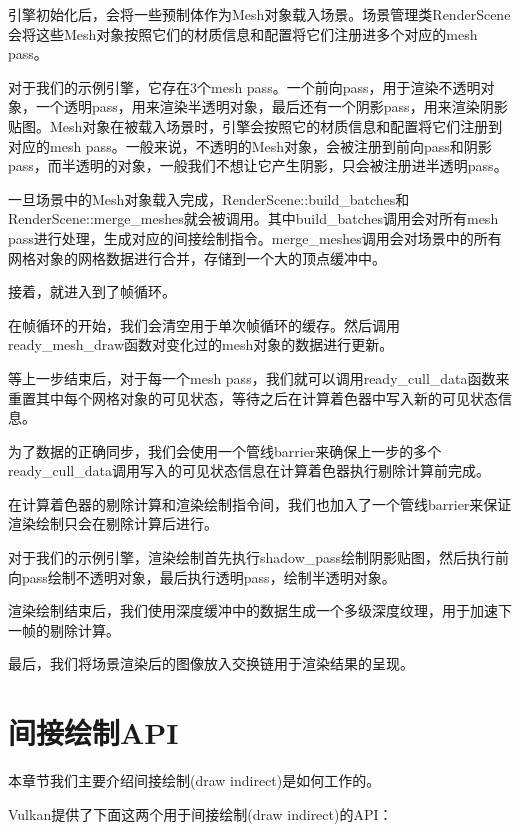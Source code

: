 \documentclass{ctexart}
\begin{document}
引擎初始化后，会将一些预制体作为Mesh对象载入场景。场景管理类RenderScene会将这些Mesh对象按照它们的材质信息和配置将它们注册进多个对应的mesh pass。

对于我们的示例引擎，它存在3个mesh pass。一个前向pass，用于渲染不透明对象，一个透明pass，用来渲染半透明对象，最后还有一个阴影pass，用来渲染阴影贴图。Mesh对象在被载入场景时，引擎会按照它的材质信息和配置将它们注册到对应的mesh pass。一般来说，不透明的Mesh对象，会被注册到前向pass和阴影pass，而半透明的对象，一般我们不想让它产生阴影，只会被注册进半透明pass。

一旦场景中的Mesh对象载入完成，RenderScene::build\_batches和RenderScene::merge\_meshes就会被调用。其中build\_batches调用会对所有mesh pass进行处理，生成对应的间接绘制指令。merge\_meshes调用会对场景中的所有网格对象的网格数据进行合并，存储到一个大的顶点缓冲中。

接着，就进入到了帧循环。

在帧循环的开始，我们会清空用于单次帧循环的缓存。然后调用ready\_mesh\_draw函数对变化过的mesh对象的数据进行更新。

等上一步结束后，对于每一个mesh pass，我们就可以调用ready\_cull\_data函数来重置其中每个网格对象的可见状态，等待之后在计算着色器中写入新的可见状态信息。

为了数据的正确同步，我们会使用一个管线barrier来确保上一步的多个ready\_cull\_data调用写入的可见状态信息在计算着色器执行剔除计算前完成。

在计算着色器的剔除计算和渲染绘制指令间，我们也加入了一个管线barrier来保证渲染绘制只会在剔除计算后进行。

对于我们的示例引擎，渲染绘制首先执行shadow\_pass绘制阴影贴图，然后执行前向pass绘制不透明对象，最后执行透明pass，绘制半透明对象。

渲染绘制结束后，我们使用深度缓冲中的数据生成一个多级深度纹理，用于加速下一帧的剔除计算。

最后，我们将场景渲染后的图像放入交换链用于渲染结果的呈现。

\newpage
\section{间接绘制API}

本章节我们主要介绍间接绘制(draw indirect)是如何工作的。

Vulkan提供了下面这两个用于间接绘制(draw indirect)的API：
\end{document}
